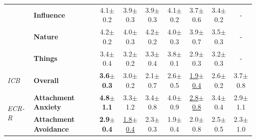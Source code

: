 \begin{poster}
{\begin{center}
{\begin{tabular}{ll cccccc|cc}
                        & \bf Influence & 4.1$\pm$0.2 & 3.9$\pm$0.3 & 3.9$\pm$0.3 & 4.1$\pm$0.2 & 3.7$\pm$0.6 & 3.4$\pm$0.2 & \multicolumn{2}{c}{-} \\
                        & \bf Nature & 4.2$\pm$0.2 & 4.0$\pm$0.3 & 4.2$\pm$0.2 & 4.0$\pm$0.3 & 3.9$\pm$0.7 & 3.5$\pm$0.3 & \multicolumn{2}{c}{-} \\
                        & \bf Things & \cellcolor{myblue!30} 3.4$\pm$0.4 & \cellcolor{myblue!30} 3.2$\pm$0.2 & \cellcolor{myblue!30} 3.3$\pm$0.4 & \cellcolor{myblue!30} 3.8$\pm$0.1 & \cellcolor{myblue!30} 2.9$\pm$0.3 & \cellcolor{myblue!30} 3.2$\pm$0.3 & \multicolumn{2}{c}{-} \\
                        \midrule
                        \multirow{1}{*}{\it ICB} &
                        \bf Overall & \bf 3.6$\pm$0.3 & 3.0$\pm$0.2 & 2.1$\pm$0.7 & 2.6$\pm$0.5 & \underline{1.9$\pm$0.4} & 2.6$\pm$0.2 & \multicolumn{2}{c}{3.7$\pm$0.8} \\
                        \midrule
                        \multirow{2}{*}{\it ECR-R} &
                        \bf Attachment Anxiety & \bf 4.8$\pm$1.1 & 3.3$\pm$1.2 & 3.4$\pm$0.8 & 4.0$\pm$0.9 & \underline{2.8$\pm$0.8} & 3.4$\pm$0.4 & \multicolumn{2}{c}{2.9$\pm$1.1} \\
                        & \bf Attachment Avoidance & \bf 2.9$\pm$0.4 & \underline{1.8$\pm$0.4} & 2.3$\pm$0.3 & 1.9$\pm$0.4 & 2.0$\pm$0.8 & 2.5$\pm$0.5 & \multicolumn{2}{c}{2.3$\pm$1.0} \\
                        \bottomrule
                    \end{tabular}
                }
            \end{center}

        }


\end{poster}

